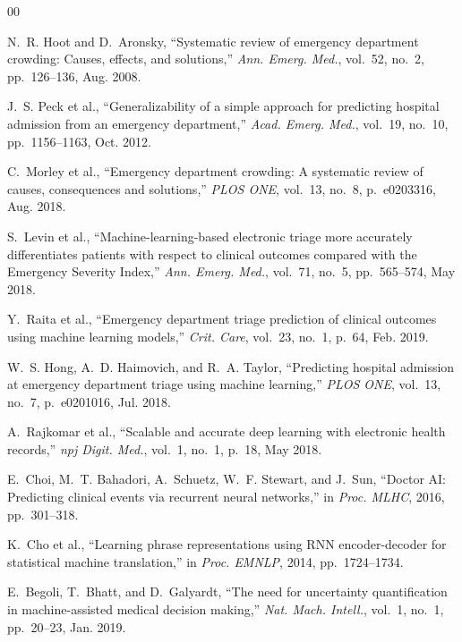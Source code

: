 \documentclass[runningheads]{llncs}
\begin{document}
\begin{thebibliography}{00}

N.~R. Hoot and D.~Aronsky, ``Systematic review of emergency department crowding: Causes, effects, and solutions,'' \textit{Ann. Emerg. Med.}, vol.~52, no.~2, pp.~126--136, Aug. 2008.

J.~S. Peck et al., ``Generalizability of a simple approach for predicting hospital admission from an emergency department,'' \textit{Acad. Emerg. Med.}, vol.~19, no.~10, pp.~1156--1163, Oct. 2012.

C.~Morley et al., ``Emergency department crowding: A systematic review of causes, consequences and solutions,'' \textit{PLOS ONE}, vol.~13, no.~8, p.~e0203316, Aug. 2018.

S.~Levin et al., ``Machine-learning-based electronic triage more accurately differentiates patients with respect to clinical outcomes compared with the Emergency Severity Index,'' \textit{Ann. Emerg. Med.}, vol.~71, no.~5, pp.~565--574, May 2018.

Y.~Raita et al., ``Emergency department triage prediction of clinical outcomes using machine learning models,'' \textit{Crit. Care}, vol.~23, no.~1, p.~64, Feb. 2019.

W.~S. Hong, A.~D. Haimovich, and R.~A. Taylor, ``Predicting hospital admission at emergency department triage using machine learning,'' \textit{PLOS ONE}, vol.~13, no.~7, p.~e0201016, Jul. 2018.

A.~Rajkomar et al., ``Scalable and accurate deep learning with electronic health records,'' \textit{npj Digit. Med.}, vol.~1, no.~1, p.~18, May 2018.

E.~Choi, M.~T. Bahadori, A.~Schuetz, W.~F. Stewart, and J.~Sun, ``Doctor AI: Predicting clinical events via recurrent neural networks,'' in \textit{Proc. MLHC}, 2016, pp.~301--318.

K.~Cho et al., ``Learning phrase representations using RNN encoder-decoder for statistical machine translation,'' in \textit{Proc. EMNLP}, 2014, pp.~1724--1734.

E.~Begoli, T.~Bhatt, and D.~Galyardt, ``The need for uncertainty quantification in machine-assisted medical decision making,'' \textit{Nat. Mach. Intell.}, vol.~1, no.~1, pp.~20--23, Jan. 2019.


\end{thebibliography}
\end{document}
